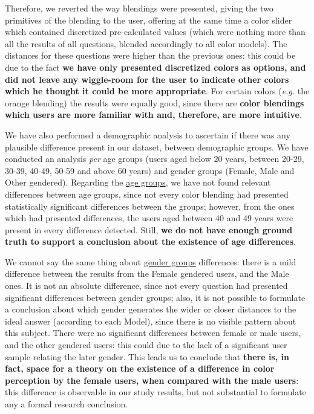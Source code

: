Therefore, we reverted the way blendings were presented, giving the two primitives of the blending to the user, offering at the same time a color slider which contained discretized pre-calculated values (which were nothing more than all the results of all questions,
blended accordingly to all color models). The distances for these questions were higher than the previous ones: this could be due to the fact \textbf{we have only presented discretized colors as options, and did not leave any wiggle-room for the user to indicate other
colors which he thought it could be more appropriate}. For certain colors (\emph{e.g.} the orange blending) the results were equally good, since there are \textbf{color blendings which users are more familiar with and, therefore, are more intuitive}. \par
%
We have also performed a demographic analysis to ascertain if there was any plausible difference present in our dataset, between demographic groups. We have conducted an analysis \emph{per} age groups (users aged below 20 years, between 20-29, 30-39, 40-49, 50-59 and
above 60 years) and gender groups (Female, Male and Other gendered). Regarding the \ul{age groups}, we have not found relevant differences between age groups, since not every color blending had presented statistically significant differences between the groups; however,
from the ones which had presented differences, the users aged between 40 and 49 years were present in every difference detected. Still, \textbf{we do not have enough ground truth to support a conclusion about the existence of age differences}. \par
%
We cannot say the same thing about \ul{gender groups} differences: there is a mild difference between the results from the Female gendered users, and the Male ones. It is not an absolute difference, since not every question had presented significant differences between
gender groups; also, it is not possible to formulate a conclusion about which gender generates the wider or closer distances to the ideal answer (according to each Model), since there is no visible pattern about this subject. There were no significant differences
between female or male users, and the other gendered users: this could due to the lack of a significant user sample relating the later gender. This leads us to conclude that \textbf{there is, in fact, space for a theory on the existence of a difference in color
perception by the female users, when compared with the male users}: this difference is observable in our study results, but not substantial to formulate any a formal research conclusion. \par
